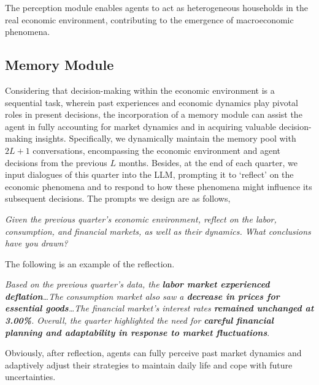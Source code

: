 The perception module enables agents to act as heterogeneous households in the real economic environment, contributing to the emergence of macroeconomic phenomena.

\subsection{Memory Module}
Considering that decision-making within the economic environment is a sequential task, wherein past experiences and economic dynamics play pivotal roles in present decisions, the incorporation of a memory module can assist the agent in fully accounting for market dynamics and in acquiring valuable decision-making insights. Specifically, we dynamically maintain the memory pool with $2L+1$ conversations, encompassing the economic environment and agent decisions from the previous $L$ months. Besides, at the end of each quarter, we input dialogues of this quarter into the LLM, prompting it to `reflect' on the economic phenomena and to respond to how these phenomena might influence its subsequent decisions. The prompts we design are as follows,

\begin{center}
\begin{minipage}{0.92\linewidth}
\begin{shaded}
\textit{Given the previous quarter's economic environment, reflect on the labor, consumption, and financial markets, as well as their dynamics. What conclusions have you drawn?}
\end{shaded}
\end{minipage}
\end{center}
The following is an example of the reflection.
\begin{center}
\begin{minipage}{0.92\linewidth}
\begin{shaded}
\textit{Based on the previous quarter's data, the \textbf{labor market experienced deflation}\ldots The consumption market also saw a \textbf{decrease in prices for essential goods}\ldots The financial market's interest rates \textbf{remained unchanged at 3.00\%}. Overall, the quarter highlighted the need for \textbf{careful financial planning and adaptability in response to market fluctuations}}.
\end{shaded}
\end{minipage}
\end{center}
Obviously, after reflection, agents can fully perceive past market dynamics and adaptively adjust their strategies to maintain daily life and cope with future uncertainties.

